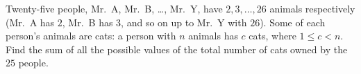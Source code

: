 Twenty-five people, Mr.\ A, Mr.\ B, \dots, Mr.\ Y, have $2,3,\dots,26$ animals respectively (Mr.\ A has $2$, Mr.\ B has $3$, and so on up to Mr.\ Y with $26$). Some of each person's animals are cats: a person with $n$ animals has $c$ cats, where $1\le c<n$. Find the sum of all the possible values of the total number of cats owned by the $25$ people.
